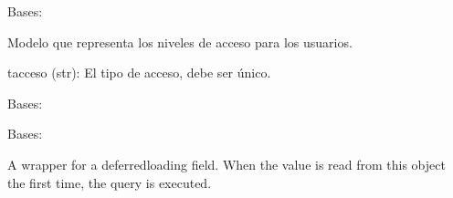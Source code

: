 \documentclass[letterpaper,10pt,spanish]{sphinxmanual}
\begin{document}
\begin{fulllineitems}

\pysigstartsignatures
{}
\pysigstopsignatures
\sphinxAtStartPar
Bases: 

\sphinxAtStartPar
Modelo que representa los niveles de acceso para los usuarios.
\begin{description}
\sphinxAtStartPar
tacceso (str): El tipo de acceso, debe ser único.

\end{description}


\begin{fulllineitems}

\pysigstartsignatures
{}
\pysigstopsignatures
\sphinxAtStartPar
Bases: 

\end{fulllineitems}



\begin{fulllineitems}

\pysigstartsignatures
{}
\pysigstopsignatures
\sphinxAtStartPar
Bases: 

\end{fulllineitems}



\begin{fulllineitems}

\pysigstartsignatures
{}
\pysigstopsignatures
\sphinxAtStartPar
A wrapper for a deferred\sphinxhyphen{}loading field. When the value is read from this
object the first time, the query is executed.

\end{fulllineitems}



\begin{fulllineitems}

\pysigstartsignatures
{}
\pysigstopsignatures
\end{fulllineitems}




\end{fulllineitems}
\end{document}
